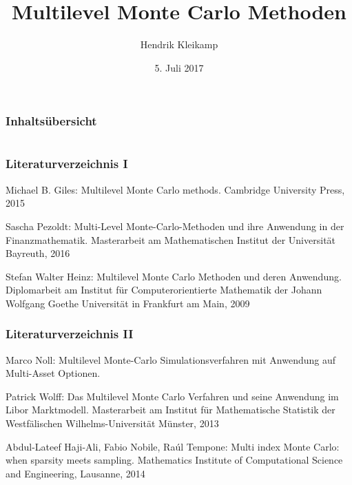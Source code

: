 \documentclass[xcolor=dvipsnames]{beamer}
\title{Multilevel Monte Carlo Methoden}
\author{Hendrik Kleikamp}
\date{5. Juli 2017}
\institute{Hauptseminar Wissenschaftliches Rechnen}
\begin{document}
\begingroup
{}
\begin{frame}
	\titlepage
\end{frame}
\endgroup

\begin{frame}
	\frametitle{Inhaltsübersicht}
	\tableofcontents
\end{frame}













\section*{}
\begin{frame}
	\frametitle{Literaturverzeichnis I}
	\begin{thebibliography}{10}
		Michael B. Giles: {\glqq Multilevel Monte Carlo methods\grqq}.
		\newblock Cambridge University Press, 2015
		
		Sascha Pezoldt: {\glqq Multi-Level Monte-Carlo-Methoden und
			ihre Anwendung in der Finanzmathematik\grqq}.
		\newblock Masterarbeit am Mathematischen Institut der Universität Bayreuth, 2016
		
		Stefan Walter Heinz: {\glqq Multilevel Monte Carlo Methoden
			und deren Anwendung\grqq}.
		\newblock Diplomarbeit am Institut für Computerorientierte Mathematik der Johann Wolfgang Goethe Universität in Frankfurt am Main, 2009
	\end{thebibliography}
\end{frame}

\begin{frame}
	\frametitle{Literaturverzeichnis II}
	\begin{thebibliography}{10}
		Marco Noll: {\glqq Multilevel Monte-Carlo Simulationsverfahren mit Anwendung auf Multi-Asset Optionen\grqq}.
		
		Patrick Wolff: {\glqq Das Multilevel Monte Carlo	Verfahren und seine Anwendung im Libor Marktmodell\grqq}.
		\newblock Masterarbeit am Institut für Mathematische Statistik der Westfälischen Wilhelms-Universität Münster, 2013
		
		Abdul-Lateef Haji-Ali, Fabio Nobile, Raúl Tempone: {\glqq Multi index Monte Carlo: when sparsity meets sampling\grqq}.
		\newblock Mathematics Institute of Computational Science and Engineering, Lausanne, 2014
	\end{thebibliography}
\end{frame}
\end{document}
